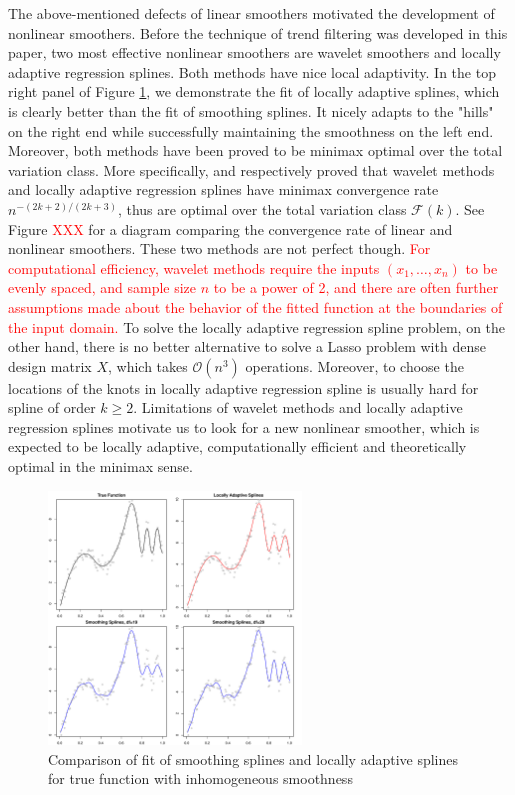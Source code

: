 \documentclass[a4paper]{article}
\renewcommand{\cal}{\mathcal}
\begin{document}
The above-mentioned defects of linear smoothers motivated the development of nonlinear smoothers. Before the technique of trend filtering was developed in this paper, two most effective nonlinear smoothers are wavelet smoothers\cite{johnstone2011gaussian,mallat2008wavelet,donoho1994ideal} and locally adaptive regression splines\cite{mammen1997locally}. Both methods have nice local adaptivity. In the top right panel of Figure \ref{fig:ssvslars}, we demonstrate the fit of locally adaptive splines, which is clearly better than the fit of smoothing splines. It nicely adapts to the "hills" on the right end while successfully maintaining the smoothness on the left end. Moreover, both methods have been proved to be minimax optimal over the total variation class. More specifically, \cite{donoho1998minimax} and \cite{mammen1997locally} respectively proved that wavelet methods and locally adaptive regression splines have minimax convergence rate $n^{-(2k+2)/(2k+3)}$, thus are optimal over the total variation class $\cal{F}(k)$. See Figure \textcolor{red}{XXX} for a diagram comparing the convergence rate of linear and nonlinear smoothers. These two methods are not perfect though. \textcolor{red}{For computational efficiency, wavelet methods require the inputs $(x_1,\ldots, x_n)$ to be evenly spaced, and sample size $n$ to be a power of 2, and there are often further assumptions made about the behavior of the fitted function at the boundaries of the input domain.} To solve the locally adaptive regression spline problem, on the other hand, there is no better alternative to solve a Lasso problem with dense design matrix $X$, which takes $\cal{O}(n^3)$ operations. Moreover, to choose the locations of the knots in locally adaptive regression spline is usually hard for spline of order $k\geq 2$. Limitations of wavelet methods and locally adaptive regression splines motivate us to look for a new nonlinear smoother, which is expected to be locally adaptive, computationally efficient and theoretically optimal in the minimax sense.

\begin{figure}[t!]
\centering
\includegraphics[width = 0.6\textwidth]{Figures/ssvslars.pdf}
\caption{Comparison of fit of smoothing splines and locally adaptive splines for true function with inhomogeneous smoothness}
\label{fig:ssvslars}
\end{figure}
\end{document}
